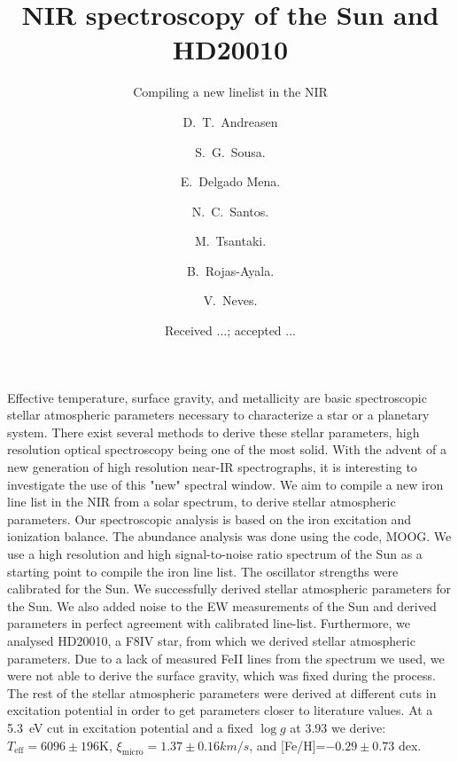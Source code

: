 \documentclass{aa}
\begin{document}
\title{NIR spectroscopy of the Sun and HD20010}
\subtitle{Compiling a new linelist in the NIR}


\author{ D.~T.~Andreasen
    \and S.~G.~Sousa.
    \and E.~Delgado Mena.
    \and N.~C.~Santos.
    \and M.~Tsantaki.
    \and B.~Rojas-Ayala.
    \and V.~Neves.}









\date{Received ...; accepted ...}

\abstract
{Effective temperature, surface gravity, and metallicity are basic
spectroscopic stellar atmospheric parameters necessary to characterize a
star or a planetary system. There exist several methods to derive these
stellar parameters, high resolution optical spectroscopy being one of
the most solid. With the advent of a new generation of high resolution
near-IR spectrographs, it is interesting to investigate the use of this
"new" spectral window.}
{We aim to compile a new iron line list in the NIR from a solar
spectrum, to derive stellar atmospheric parameters.}
{Our spectroscopic analysis is based on the iron excitation and
ionization balance. The abundance analysis was done using the code,
MOOG. We use a high resolution and high signal-to-noise ratio spectrum
of the Sun as a starting point to compile the iron line list. The
oscillator strengths were calibrated for the Sun.}
{We successfully derived stellar atmospheric parameters for the Sun.
We also added noise to the EW measurements of the Sun and derived
parameters in perfect agreement with calibrated line-list. Furthermore,
we analysed HD20010, a F8IV star, from which we derived stellar
atmospheric parameters. Due to a lack of measured FeII lines from the
spectrum we used, we were not able to derive the surface gravity, which
was fixed during the process. The rest of the stellar atmospheric
parameters were derived at different cuts in excitation potential in
order to get parameters closer to literature values. At a \SI{5.3}{eV}
cut in excitation potential and a fixed $\log g$ at 3.93 we derive:
$T_\mathrm{eff}=6096\pm196$K, $\xi_\mathrm{micro}=1.37\pm0.16\si{km/s}$,
and [Fe/H]=$-0.29\pm0.73$ dex.}
{}
\end{document}
